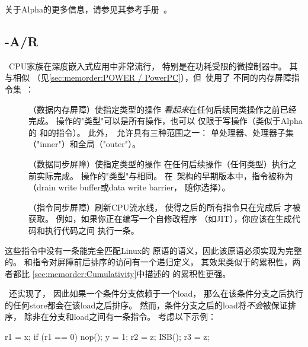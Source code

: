 关于Alpha的更多信息，请参见其参考手册~\cite{ALPHA2002}。

\subsection{-A/R}
\label{sec:memorder:ARMv7-A/R}

\ARM\ CPU家族在深度嵌入式应用中非常流行，
特别是在功耗受限的微控制器中。
其与\Power{}相似
（见\cref{sec:memorder:POWER / PowerPC}），但\ARM\ 使用了
不同的内存屏障指令集~\cite{ARMv7A:2010}：

\begin{description}
\item	[]（数据内存屏障）使指定类型的操作
	\emph{看起来}在任何后续同类操作之前已经完成。
	操作的"类型"可以是所有操作，也可以
	仅限于写操作（类似于Alpha的
	和\Power{}的指令）。
	此外，\ARM\ 允许具有三种范围之一：
	单处理器、处理器子集（"inner"）和全局（"outer"）。
\item	[]（数据同步屏障）使指定类型的操作
	在任何后续操作（任何类型）执行之前实际完成。
	操作的"类型"与相同。
	在\ARM\ 架构的早期版本中，指令被称为
	（drain write buffer或data write barrier，
	随你选择）。
\item	[]（指令同步屏障）刷新CPU流水线，
	使得之后的所有指令只在完成后
	才被获取。
	例如，如果你正在编写一个自修改程序
	（如JIT），你应该在生成代码和执行代码之间
	执行一条。
\end{description}

这些指令中没有一条能完全匹配Linux的
原语的语义，因此该原语必须实现为完整的。
和指令对屏障前后排序的访问有一个递归定义，
其效果类似于\Power{}的累积性，两者都比
\cref{sec:memorder:Cumulativity}中描述的
的累积性更强。

\ARM\ 还实现了，
因此如果一个条件分支依赖于一个load，
那么在该条件分支之后执行的任何store都会在该load之后排序。
然而，条件分支之后的load将\emph{不会}被保证排序，
除非在分支和load之间有一条指令。
考虑以下示例：

\begin{fcvlabel}
\begin{VerbatimN}[commandchars=\\\[\]]
r1 = x;			\lnlbl[x]
if (r1 == 0)		\lnlbl[if]
	nop();		\lnlbl[nop]
y = 1;			\lnlbl[y]
r2 = z;			\lnlbl[z1]
ISB();			\lnlbl[isb]
r3 = z;			\lnlbl[z2]
\end{VerbatimN}
\end{fcvlabel}

